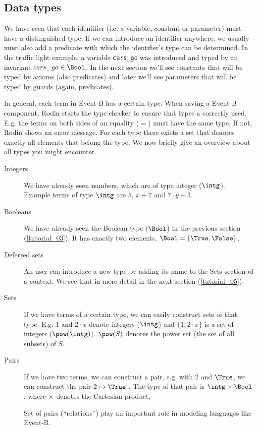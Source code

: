 \subsection{Data types}
\label{tut04:types}
We have seen that each identifier (i.e. a variable, constant or parameter) must have a distinguished type.
If we can introduce an identifier anywhere, we usually must also add a predicate with which the
identifier's type can be determined. In the traffic light example, a variable \texttt{cars\_go} was
introduced and typed by an invariant $cars\_go \in \Bool$. In the next section we'll see constants that
will be typed by axioms (also predicates) and later we'll see parameters that will be typed by guards (again, predicates).

In general, each term in Event-B has a certain type. 
When saving a Event-B component, Rodin starts the type checker to ensure that types a correctly used.
E.g. the terms on both sides of an equality ($=$) must have the same type. If not, Rodin shows an error message.
For each type there exists a set that denotes exactly all elements that belong the type. We now briefly
give an overview about all types you might encounter.

\begin{description}
\item[Integers] 
  We have already seen numbers, which are of type integer ($\intg$).
  Example terms of type $\intg$ are $5$, $x+7$ and $7 \cdot y - 3$.
\item[Booleans] 
  We have already seen the Boolean type ($\Bool$) in the previous section (\ref{tutorial_03}).
  It has exactly two elements, $\Bool = \{\True,\False\}$.
\item[Deferred sets] 
  An user can introduce a new type by adding its name to the
  \textsf{Sets} section of a context. We see that in more detail in the next section (\ref{tutorial_05}).
\item[Sets]
  If we have terms of a certain type, we can easily construct sets of that type.
  E.g. $1$ and $2\cdot x$ denote integers ($\intg$) and $\{1,2\cdot x\}$ is a set of integers ($\pow(\intg)$).
  $\pow(S)$  denotes the power set (the set of all subsets) of $S$.
\item[Pairs] 
  If we have two terms, we can construct a pair, e.g. with $2$ and $\True$, we
  can construct the pair $2\mapsto\True$ .
  The type of that pair is $\intg\cprod\Bool$, where $\mathbin\times$ denotes the Cartesian product.

  Set of pairs (``relations'') play an important role in modeling languages like Event-B.
\end{description}

